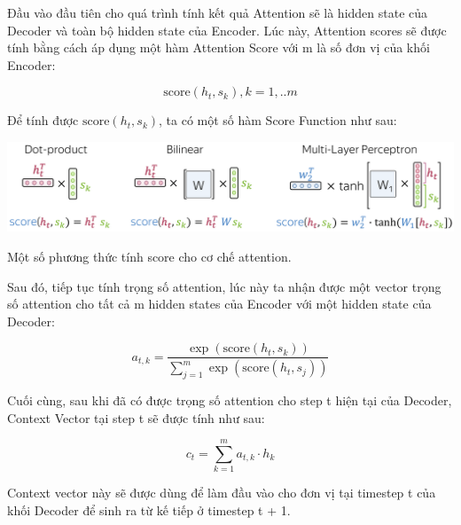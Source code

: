 \documentclass[a4paper, 12pt, openany]{book}
\begin{document}
Đầu vào đầu tiên cho quá trình tính kết quả Attention sẽ là hidden state của Decoder và toàn bộ hidden state của Encoder.
Lúc này, Attention scores sẽ được tính bằng cách áp dụng một hàm Attention Score với m là số đơn vị của khối Encoder:
\begin{center}
    \begin{equation}
        \text{score}(h_t, s_k), k=1,..m
    \end{equation}
\end{center}
\vspace{0.5cm}

Để tính được \( \text{score}(h_t, s_k) \), ta có một số hàm Score Function như sau:

\begin{minipage}{\linewidth}
    \captionsetup{type=figure}
    \centering
    \includegraphics[width=\linewidth]{./assets/images/score_functions-min.png}
    \caption{Một số phương thức tính score cho cơ chế attention.}
\end{minipage}
\vspace{0.5cm}

Sau đó, tiếp tục tính trọng số attention, lúc này ta nhận được một vector trọng số attention cho tất cả m hidden states của Encoder với một hidden state của Decoder:

\begin{equation}
    a_{t,k} = \frac{\exp(\text{{score}}(h_t, s_k))}{\sum_{j=1}^{m} \exp(\text{{score}}(h_t, s_j))}
\end{equation}

Cuối cùng, sau khi đã có được trọng số attention cho step t hiện tại của Decoder, Context Vector tại step t sẽ được tính như sau:

\begin{equation}
    c_t = \sum_{k=1}^{m} a_{t,k} \cdot h_k
\end{equation}


Context vector này sẽ được dùng để làm đầu vào cho đơn vị tại timestep t của khối Decoder để sinh ra từ kế tiếp ở timestep t + 1.
\end{document}
